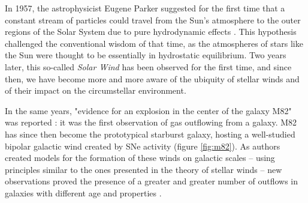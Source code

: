 In 1957, the astrophysicist Eugene Parker suggested for the first time that a constant stream of particles could travel from the Sun's atmosphere to the outer regions of the Solar System due to pure hydrodynamic effects \citep{parker_wind}. This hypothesis challenged the conventional wisdom of that time, as the atmospheres of stars like the Sun were thought to be essentially in hydrostatic equilibrium. Two years later, this so-called \textit{Solar Wind} has been observed for the first time, and since then, we have become more and more aware of the ubiquity of stellar winds and of their impact on the circumstellar environment.


In the same years, "evidence for
an explosion in the center of the galaxy M82" was reported \citep{lynds_m82}: it was the first observation of gas outflowing from a galaxy. M82 has since then become the prototypical starburst galaxy, hosting a well-studied bipolar galactic wind created by SNe activity (figure \ref{fig:m82}). As authors created models for the formation of these winds on galactic scales \citep{chevalier_clegg:1985} -- using principles similar to the ones presented in the theory of stellar winds \citep{stellar_winds_holzer} -- new observations proved the presence of a greater and greater number of outflows in galaxies with different age and properties \citep{osterbrock_1960, burke_1968}. 

